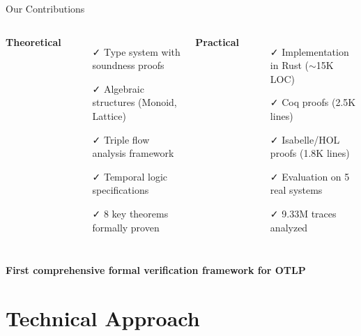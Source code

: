 \documentclass[aspectratio=169,xcolor=dvipsnames]{beamer}
\begin{document}
\begin{frame}{Our Contributions}
\begin{columns}[T]
\textbf{Theoretical}
\begin{itemize}
    \item[\color{green}✓] Type system with soundness proofs
    \item[\color{green}✓] Algebraic structures (Monoid, Lattice)
    \item[\color{green}✓] Triple flow analysis framework
    \item[\color{green}✓] Temporal logic specifications
    \item[\color{green}✓] 8 key theorems formally proven
\end{itemize}

\textbf{Practical}
\begin{itemize}
    \item[\color{green}✓] Implementation in Rust ($\sim$15K LOC)
    \item[\color{green}✓] Coq proofs (2.5K lines)
    \item[\color{green}✓] Isabelle/HOL proofs (1.8K lines)
    \item[\color{green}✓] Evaluation on 5 real systems
    \item[\color{green}✓] 9.33M traces analyzed
\end{itemize}
\end{columns}

\vspace{1em}
\begin{center}
\textbf{\large First comprehensive formal verification framework for OTLP}
\end{center}
\end{frame}

\section{Technical Approach}
\end{document}

